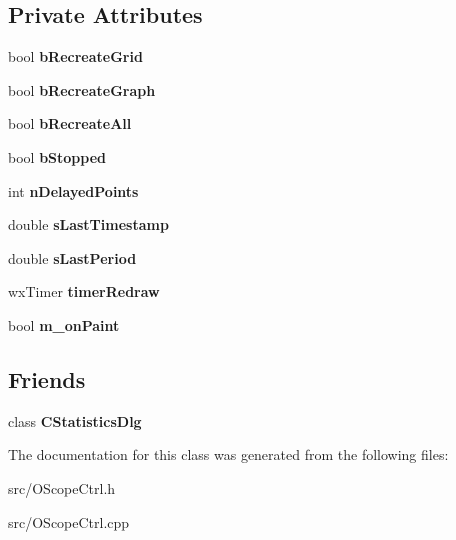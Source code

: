 \subsection*{Private Attributes}
\begin{DoxyCompactItemize}
\item 
bool {\bfseries bRecreateGrid}\label{classCOScopeCtrl_ac4902cfe002a352eac316e6092e67332}

\item 
bool {\bfseries bRecreateGraph}\label{classCOScopeCtrl_a9a4ed25e8eabe9be093e5c9e2e77e614}

\item 
bool {\bfseries bRecreateAll}\label{classCOScopeCtrl_a7e48f2832abce2be0ad19fbaee5a3238}

\item 
bool {\bfseries bStopped}\label{classCOScopeCtrl_a87f33efe7d5cb9b039d76d606555fe33}

\item 
int {\bfseries nDelayedPoints}\label{classCOScopeCtrl_a396e7f5f91b0dc5389fa198db823b138}

\item 
double {\bfseries sLastTimestamp}\label{classCOScopeCtrl_a9d8a4897a62f5e71d0edc06788005f7b}

\item 
double {\bfseries sLastPeriod}\label{classCOScopeCtrl_a6c9527be9a5884901f0286838f19cda7}

\item 
wxTimer {\bfseries timerRedraw}\label{classCOScopeCtrl_aa850c91022c439aa9a9702310b0e36b9}

\item 
bool {\bfseries m\_\-onPaint}\label{classCOScopeCtrl_a453218d555098928e442be949f996614}

\end{DoxyCompactItemize}
\subsection*{Friends}
\begin{DoxyCompactItemize}
\item 
class {\bf CStatisticsDlg}\label{classCOScopeCtrl_ad52500fde9069f98bae7c29011758806}

\end{DoxyCompactItemize}


The documentation for this class was generated from the following files:\begin{DoxyCompactItemize}
\item 
src/OScopeCtrl.h\item 
src/OScopeCtrl.cpp\end{DoxyCompactItemize}
